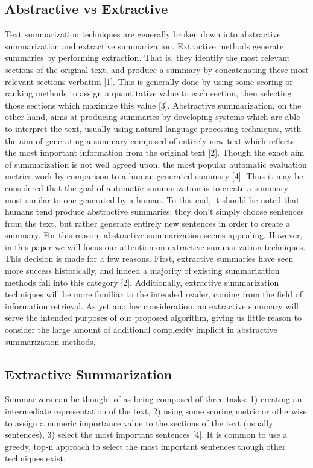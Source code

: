 \documentclass[11pt]{article}
\begin{document}
\subsection{Abstractive vs Extractive}
\label{sec:orgf88625b}
Text summarization techniques are generally broken down into abstractive summarization and extractive summarization. Extractive methods generate summaries by performing extraction. That is, they identify the most relevant sections of the original text, and produce a summary by concatenating these most relevant sections verbatim [1]. This is generally done by using some scoring or ranking methods to assign a quantitative value to each section, then selecting those sections which maximize this value [3]. Abstractive summarization, on the other hand, aims at producing summaries by developing systems which are able to interpret the text, usually using natural language processing techniques, with the aim of generating a summary composed of entirely new text which reflects the most important information from the original text [2]. Though the exact aim of summarization is not well agreed upon, the most popular automatic evaluation metrics work by comparison to a human generated summary [4]. Thus it may be considered that the goal of automatic summarization is to create a summary most similar to one generated by a human. To this end, it should be noted that humans tend produce abstractive summaries; they don't simply choose sentences from the text, but rather generate entirely new sentences in order to create a summary. For this reason, abstractive summarization seems appealing. However, in this paper we will focus our attention on extractive summarization techniques. This decision is made for a few reasons. First, extractive summaries have seen more success historically, and indeed a majority of existing summarization methods fall into this category [2]. Additionally, extractive summarization techniques will be more familiar to the intended reader, coming from the field of information retrieval. As yet another consideration, an extractive summary will serve the intended purposes of our proposed algorithm, giving us little reason to consider the large amount of additional complexity implicit in abstractive summarization methods. 
\subsection{Extractive Summarization}
\label{sec:org8285412}
Summarizers can be thought of as being composed of three tasks: 1) creating an intermediate representation of the text, 2) using some scoring metric or otherwise to assign a numeric importance value to the sections of the text (usually sentences), 3) select the most important sentences [4]. It is common to use a greedy, top-n approach to select the most important sentences though other techniques exist. 
\end{document}
